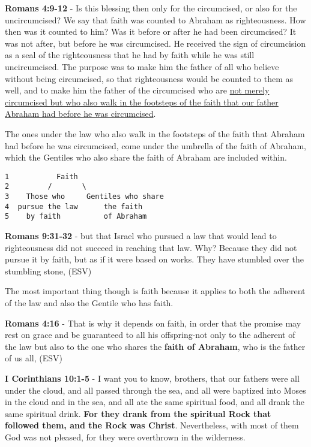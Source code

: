 \documentclass[11pt]{article}
\begin{document}
\textbf{Romans 4:9-12} - Is this blessing then only for the circumcised, or also for the uncircumcised? We say that faith was counted to Abraham as righteousness. How then was it counted to him? Was it before or after he had been circumcised? It was not after, but before he was circumcised. He received the sign of circumcision as a seal of the righteousness that he had by faith while he was still uncircumcised. The purpose was to make him the father of all who believe without being circumcised, so that righteousness would be counted to them as well, and to make him the father of the circumcised who are \uline{not merely circumcised but who also walk in the footsteps of the faith that our father Abraham had before he was circumcised}.

The ones under the law who also walk in the footsteps of the faith that Abraham had before he was circumcised, come under the umbrella of the faith of Abraham, which the Gentiles who also share the faith of Abraham are included within.

\begin{verbatim}
1           Faith
2         /       \
3    Those who     Gentiles who share
4  pursue the law      the faith
5    by faith          of Abraham
\end{verbatim}

\textbf{Romans 9:31-32} - but that Israel who pursued a law that would lead to righteousness did not succeed in reaching that law. Why? Because they did not pursue it by faith, but as if it were based on works. They have stumbled over the stumbling stone, (ESV)

The most important thing though is faith because it applies to both the adherent of the law and also the Gentile who has faith.

\textbf{Romans 4:16} - That is why it depends on faith, in order that the promise may rest on grace and be guaranteed to all his offspring-not only to the adherent of the law but also to the one who shares the \textbf{faith of Abraham}, who is the father of us all, (ESV)

\textbf{I Corinthians 10:1-5} - I want you to know, brothers, that our fathers were all under the cloud, and all passed through the sea, and all were baptized into Moses in the cloud and in the sea, and all ate the same spiritual food, and all drank the same spiritual drink. \textbf{For they drank from the spiritual Rock that followed them, and the Rock was Christ}. Nevertheless, with most of them God was not pleased, for they were overthrown in the wilderness.
\end{document}
